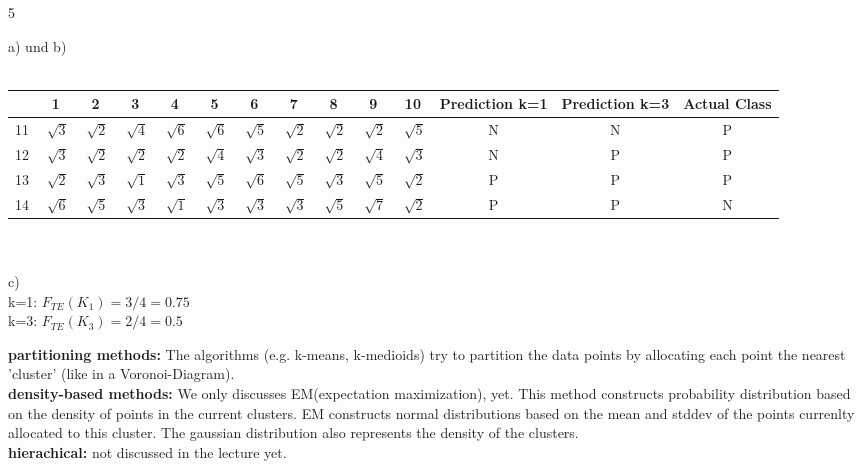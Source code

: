 \documentclass{article}
\begin{document}
\begin{ukon-infie}[29.11.17]{5}
		\begin{exercise}[p=10]{}
		a) und b)\\\\
		\begin{tabular}{|c|c|c|c|c|c|c|c|c|c|c|c|c|c|}
		\hline 
		 & 1 & 2 & 3 & 4 & 5 & 6 & 7 & 8 & 9 & 10 & Prediction k=1 & Prediction k=3 & Actual Class \\ 
		\hline 
		11 & $\sqrt[]{3}$ & $\sqrt[]{2}$ & $\sqrt[]{4}$ & $\sqrt[]{6}$ & $\sqrt[]{6}$ & $\sqrt[]{5}$ & $\sqrt[]{2}$ & $\sqrt[]{2}$ & $\sqrt[]{2}$ & $\sqrt[]{5}$ & N & N & P \\ 
		\hline 
		12 & $\sqrt[]{3}$ & $\sqrt[]{2}$ & $\sqrt[]{2}$ & $\sqrt[]{2}$ & $\sqrt[]{4}$ & $\sqrt[]{3}$ & $\sqrt[]{2}$ & $\sqrt[]{2}$ & $\sqrt[]{4}$ & $\sqrt[]{3}$ & N & P & P \\ 
		\hline 
		13 & $\sqrt[]{2}$ & $\sqrt[]{3}$ & $\sqrt[]{1}$ & $\sqrt[]{3}$ & $\sqrt[]{5}$ & $\sqrt[]{6}$ & $\sqrt[]{5}$ & $\sqrt[]{3}$ & $\sqrt[]{5}$ & $\sqrt[]{2}$ & P & P & P \\ 
		\hline 
		14 & $\sqrt[]{6}$ & $\sqrt[]{5}$ & $\sqrt[]{3}$ & $\sqrt[]{1}$ & $\sqrt[]{3}$ & $\sqrt[]{3}$ & $\sqrt[]{3}$ & $\sqrt[]{5}$ & $\sqrt[]{7}$ & $\sqrt[]{2}$ & P & P & N \\ 
		\hline 
		\end{tabular}\\\\
		c) \\
		k=1: $F_{TE}(K_1) = 3/4 =0.75$\\
		k=3: $F_{TE}(K_3) = 2/4 =0.5$\\
		
		\end{exercise}
		
		\begin{exercise}[p=4]{}
			
		\end{exercise}
		
		


		\begin{exercise}[p=3]{}
		{
			\textbf{partitioning methods:} The algorithms (e.g. k-means, k-medioids) try to partition the data points by allocating each point the nearest 'cluster' (like in a Voronoi-Diagram).\\
			\textbf{density-based methods:} We only discusses EM(expectation maximization), yet. This method constructs probability distribution based on the density of points in the current clusters. EM constructs normal distributions based on the mean and stddev of the points currenlty allocated to this cluster. The gaussian distribution also represents the density of the clusters.\\
			\textbf{hierachical:} not discussed in the lecture yet.
		}
		

		\end{exercise}
		
		
\end{ukon-infie}
\end{document}
